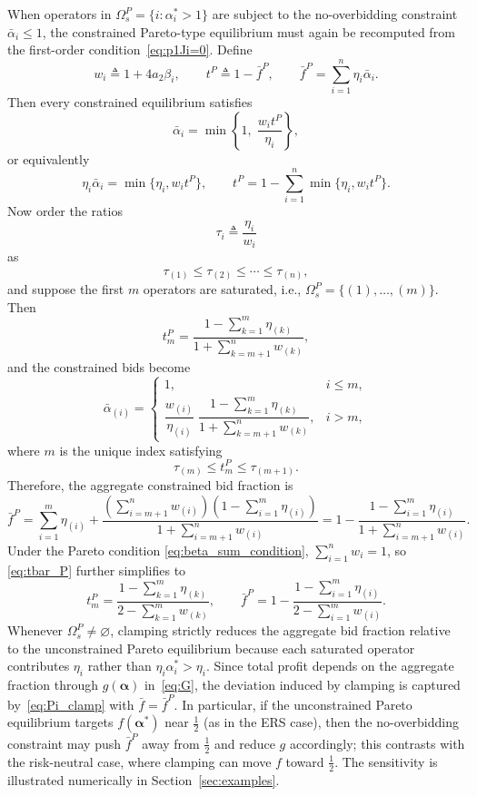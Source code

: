 \documentclass[conference]{IEEEtran}
\begin{document}
When operators in $\Omega_s^P = \{i : \alpha_i^* > 1\}$ are subject to the no-overbidding constraint $\bar{\alpha}_i\le 1$, the constrained Pareto-type equilibrium must again be recomputed from the first-order condition~\eqref{eq:p1Ji=0}. Define
\[
w_i\triangleq 1+4a_2\beta_i,\qquad
t^P\triangleq 1-\bar{f}^P,\qquad
\bar{f}^P=\sum_{i=1}^n \eta_i\bar{\alpha}_i .
\]
Then every constrained equilibrium satisfies
\begin{equation}
\bar{\alpha}_i
=
\min\!\left\{1,\; \frac{w_i t^P}{\eta_i}\right\},
\label{eq:alpha_clamp_P_closed}
\end{equation}
or equivalently
\[
\eta_i\bar{\alpha}_i=\min\{\eta_i,w_i t^P\},\qquad
t^P=1-\sum_{i=1}^n\min\{\eta_i,w_i t^P\}.
\]
Now order the ratios
\[
\tau_i\triangleq \frac{\eta_i}{w_i}
\]
as
\[
\tau_{(1)}\le \tau_{(2)}\le \cdots \le \tau_{(n)},
\]
and suppose the first $m$ operators are saturated, i.e., $\Omega_s^P=\{(1),\ldots,(m)\}$. Then
\begin{equation}
t_m^P=
\frac{1-\sum_{k=1}^m \eta_{(k)}}{1+\sum_{k=m+1}^n w_{(k)}},
\label{eq:tbar_P}
\end{equation}
and the constrained bids become
\begin{equation}
\bar{\alpha}_{(i)}=
\left\{
\begin{array}{ll}
1, & i\le m,\\[2mm]
\dfrac{w_{(i)}}{\eta_{(i)}}\;
\dfrac{1-\sum_{k=1}^m \eta_{(k)}}{1+\sum_{k=m+1}^n w_{(k)}}, & i>m,
\end{array}
\right.
\label{eq:alpha_bar_P_active}
\end{equation}
where $m$ is the unique index satisfying
\[
\tau_{(m)}\le t_m^P\le \tau_{(m+1)}.
\]
Therefore, the aggregate constrained bid fraction is
\begin{equation}
\bar{f}^{P}
=
\sum_{i=1}^m\eta_{(i)}
+
\frac{\left(\sum_{i=m+1}^n w_{(i)}\right)\left(1-\sum_{i=1}^m\eta_{(i)}\right)}
{1+\sum_{i=m+1}^n w_{(i)}}
=
1-\frac{1-\sum_{i=1}^m\eta_{(i)}}{1+\sum_{i=m+1}^n w_{(i)}}.
\label{eq:fbar_P}
\end{equation}
Under the Pareto condition \eqref{eq:beta_sum_condition}, $\sum_{i=1}^n w_i = 1$, so \eqref{eq:tbar_P} further simplifies to
\[
t_m^P=
\frac{1-\sum_{k=1}^m \eta_{(k)}}{2-\sum_{k=1}^m w_{(k)}},
\qquad
\bar{f}^{P}
=
1-\frac{1-\sum_{i=1}^m\eta_{(i)}}{2-\sum_{i=1}^m w_{(i)}}.
\]
Whenever $\Omega_s^P\neq\varnothing$, clamping strictly reduces the aggregate bid fraction relative to the unconstrained Pareto equilibrium because each saturated operator contributes $\eta_i$ rather than $\eta_i\alpha_i^*>\eta_i$. Since total profit depends on the aggregate fraction through $g(\boldsymbol{\alpha})$ in~\eqref{eq:G}, the deviation induced by clamping is captured by~\eqref{eq:Pi_clamp} with $\bar{f}=\bar{f}^P$. In particular, if the unconstrained Pareto equilibrium targets $f(\boldsymbol{\alpha}^*)$ near $\tfrac{1}{2}$ (as in the ERS case), then the no-overbidding constraint may push $\bar{f}^P$ away from $\tfrac{1}{2}$ and reduce $g$ accordingly; this contrasts with the risk-neutral case, where clamping can move $f$ toward $\tfrac{1}{2}$. The sensitivity is illustrated numerically in Section~\ref{sec:examples}.
\end{document}
